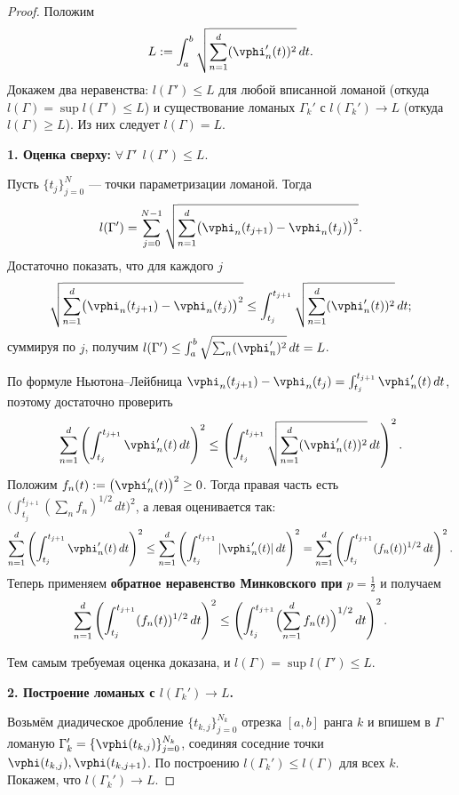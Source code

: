\begin{proof}
	Положим
	\[
	L:=\int_a^b \sqrt{\sum_{n=1}^d (\vphi_n'(t))^2}\,dt.
	\]
	Докажем два неравенства: $l(\Gamma')\le L$ для любой вписанной ломаной
	(откуда $l(\Gamma)=\sup l(\Gamma')\le L$) и существование ломаных
	$\Gamma_k'$ с $l(\Gamma_k')\to L$ (откуда $l(\Gamma)\ge L$). Из них следует
	$l(\Gamma)=L$.
	
	\medskip
	\textbf{1. Оценка сверху:} $\forall\,\Gamma'\ \ l(\Gamma')\le L$.
	
	Пусть $\{t_j\}_{j=0}^N$ --- точки параметризации ломаной. Тогда
	\[
	l(\Gamma')=\sum_{j=0}^{N-1}
	\sqrt{\sum_{n=1}^d \bigl(\vphi_n(t_{j+1})-\vphi_n(t_j)\bigr)^2}.
	\]
	Достаточно показать, что для каждого $j$
	\[
	\sqrt{\sum_{n=1}^d \bigl(\vphi_n(t_{j+1})-\vphi_n(t_j)\bigr)^2}
	\le
	\int_{t_j}^{t_{j+1}} \sqrt{\sum_{n=1}^d (\vphi_n'(t))^2}\,dt;
	\]
	суммируя по $j$, получим $l(\Gamma')\le\int_a^b\sqrt{\sum_n(\vphi_n')^2}\,dt=L$.
	
	По формуле Ньютона--Лейбница
	$\vphi_n(t_{j+1})-\vphi_n(t_j)=\int_{t_j}^{t_{j+1}}\vphi_n'(t)\,dt$, поэтому
	достаточно проверить
	\[
	\sum_{n=1}^d \left(\int_{t_j}^{t_{j+1}} \vphi_n'(t)\,dt\right)^2
	\le
	\left(\int_{t_j}^{t_{j+1}} \sqrt{\sum_{n=1}^d (\vphi_n'(t))^2}\,dt\right)^2.
	\]
	Положим $f_n(t):=\bigl(\vphi_n'(t)\bigr)^2\ge0$. Тогда правая часть есть
	$\bigl(\int_{t_j}^{t_{j+1}}(\sum_n f_n)^{1/2}\,dt\bigr)^2$, а левая
	оценивается так:
	\[
	\sum_{n=1}^d \left(\int_{t_j}^{t_{j+1}} \vphi_n'(t)\,dt\right)^2
	\le
	\sum_{n=1}^d \left(\int_{t_j}^{t_{j+1}} |\vphi_n'(t)|\,dt\right)^2
	=
	\sum_{n=1}^d \left(\int_{t_j}^{t_{j+1}} (f_n(t))^{1/2}\,dt\right)^2.
	\]
	Теперь применяем \textbf{обратное неравенство Минковского при $p=\frac12$}
	и получаем
	\[
	\sum_{n=1}^d \left(\int_{t_j}^{t_{j+1}} (f_n(t))^{1/2}\,dt\right)^2
	\le
	\left(\int_{t_j}^{t_{j+1}} \Bigl(\sum_{n=1}^d f_n(t)\Bigr)^{1/2}\,dt\right)^2.
	\]

	Тем самым требуемая оценка доказана, и $l(\Gamma)=\sup l(\Gamma')\le L$.
	
	\medskip
	\textbf{2. Построение ломаных с $l(\Gamma_k')\to L$.}
	
	Возьмём диадическое дробление $\{t_{k,j}\}_{j=0}^{N_k}$ отрезка $[a,b]$ ранга
	$k$ и впишем в $\Gamma$ ломаную $\Gamma_k'=\{\vphi(t_{k,j})\}_{j=0}^{N_k}$,
	соединяя соседние точки $\vphi(t_{k,j}),\vphi(t_{k,j+1})$. По построению
	$l(\Gamma_k')\le l(\Gamma)$ для всех $k$. Покажем, что $l(\Gamma_k')\to L$.
	

\end{proof}
